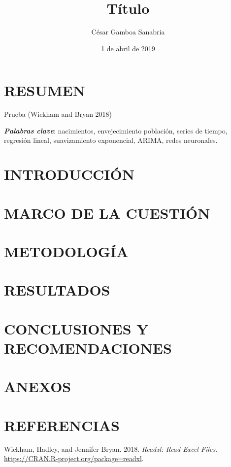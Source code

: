 \documentclass[]{article}
\title{Título}
\author{César Gamboa Sanabria}
\date{1 de abril de 2019}
\begin{document}
\maketitle

\newpage

\section*{RESUMEN}

Prueba (Wickham and Bryan 2018)

\textbf{\emph{Palabras clave}}: nacimientos, envejecimiento población,
series de tiempo, regresión lineal, suavizamiento exponencial, ARIMA,
redes neuronales.

\newpage

\tableofcontents

\newpage

\section{INTRODUCCIÓN}

\section{MARCO DE LA CUESTIÓN}

\section{METODOLOGÍA}

\section{RESULTADOS}

\section{CONCLUSIONES Y RECOMENDACIONES}

\section{ANEXOS}

\section{REFERENCIAS}

\hypertarget{refs}{}
\hypertarget{ref-readxl}{}
Wickham, Hadley, and Jennifer Bryan. 2018. \emph{Readxl: Read Excel
Files}. \url{https://CRAN.R-project.org/package=readxl}.
\end{document}
